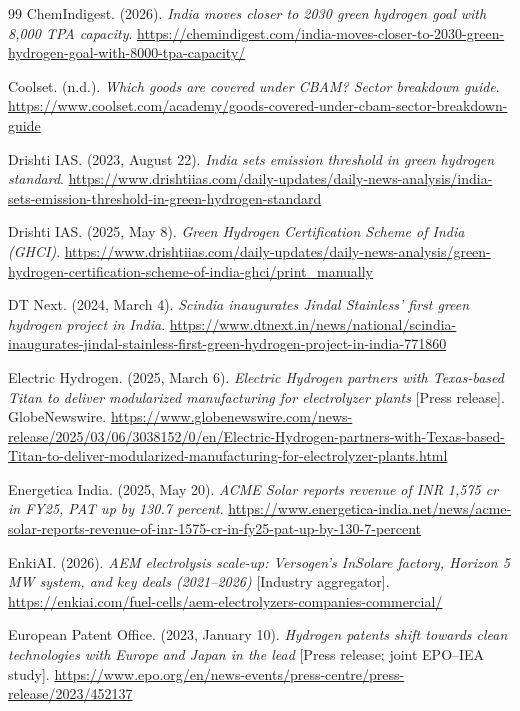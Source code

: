 {\begin{thebibliography}{99}
 ChemIndigest. (2026). \emph{India moves closer to 2030 green hydrogen goal with 8,000 TPA capacity}. \url{https://chemindigest.com/india-moves-closer-to-2030-green-hydrogen-goal-with-8000-tpa-capacity/}

 Coolset. (n.d.). \emph{Which goods are covered under CBAM? Sector breakdown guide}. \url{https://www.coolset.com/academy/goods-covered-under-cbam-sector-breakdown-guide}

 Drishti IAS. (2023, August 22). \emph{India sets emission threshold in green hydrogen standard}. \url{https://www.drishtiias.com/daily-updates/daily-news-analysis/india-sets-emission-threshold-in-green-hydrogen-standard}

 Drishti IAS. (2025, May 8). \emph{Green Hydrogen Certification Scheme of India (GHCI)}. \url{https://www.drishtiias.com/daily-updates/daily-news-analysis/green-hydrogen-certification-scheme-of-india-ghci/print_manually}

 DT Next. (2024, March 4). \emph{Scindia inaugurates Jindal Stainless' first green hydrogen project in India}. \url{https://www.dtnext.in/news/national/scindia-inaugurates-jindal-stainless-first-green-hydrogen-project-in-india-771860}

 Electric Hydrogen. (2025, March 6). \emph{Electric Hydrogen partners with Texas-based Titan to deliver modularized manufacturing for electrolyzer plants} [Press release]. GlobeNewswire. \url{https://www.globenewswire.com/news-release/2025/03/06/3038152/0/en/Electric-Hydrogen-partners-with-Texas-based-Titan-to-deliver-modularized-manufacturing-for-electrolyzer-plants.html}

 Energetica India. (2025, May 20). \emph{ACME Solar reports revenue of INR 1,575 cr in FY25, PAT up by 130.7 percent}. \url{https://www.energetica-india.net/news/acme-solar-reports-revenue-of-inr-1575-cr-in-fy25-pat-up-by-130-7-percent}

 EnkiAI. (2026). \emph{AEM electrolysis scale-up: Versogen's InSolare factory, Horizon 5 MW system, and key deals (2021–2026)} [Industry aggregator]. \url{https://enkiai.com/fuel-cells/aem-electrolyzers-companies-commercial/}

 European Patent Office. (2023, January 10). \emph{Hydrogen patents shift towards clean technologies with Europe and Japan in the lead} [Press release; joint EPO–IEA study]. \url{https://www.epo.org/en/news-events/press-centre/press-release/2023/452137}


\end{thebibliography}}
